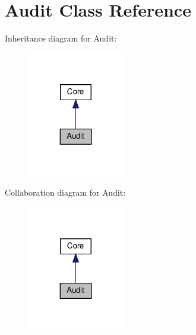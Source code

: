 \hypertarget{classAudit}{}\section{Audit Class Reference}
\label{classAudit}


Inheritance diagram for Audit\+:\nopagebreak
\begin{figure}[H]
\begin{center}
\leavevmode
\includegraphics[width=119pt]{classAudit__inherit__graph}
\end{center}
\end{figure}


Collaboration diagram for Audit\+:\nopagebreak
\begin{figure}[H]
\begin{center}
\leavevmode
\includegraphics[width=119pt]{classAudit__coll__graph}
\end{center}
\end{figure}
